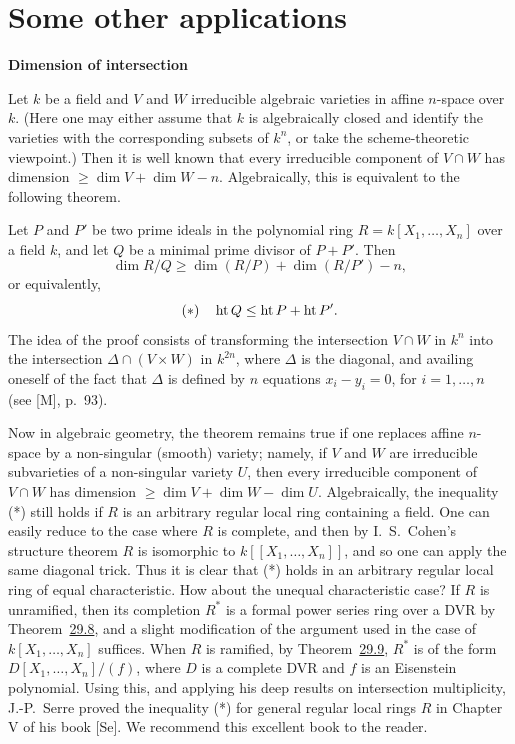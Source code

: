 \section{Some other applications}\label{sec:33}

\medskip
\noindent\textbf{Dimension of intersection}

Let $k$ be a field and $V$ and $W$ irreducible algebraic varieties in affine
$n$-space over $k$. (Here one may either assume that $k$ is algebraically closed
and identify the varieties with the corresponding subsets of $k^n$, or take the
scheme-theoretic viewpoint.) Then it is well known that every irreducible
component of $V \cap W$ has dimension $\ge \dim V + \dim W - n$. Algebraically, this
is equivalent to the following theorem.

Let $P$ and $P'$ be two prime ideals in the polynomial ring $R = k[X_1, \ldots, X_n]$
over a field $k$, and let $Q$ be a minimal prime divisor of $P + P'$. Then
\[
  \dim R/Q \ge \dim(R/P) + \dim(R/P') - n,
\]
or equivalently,
\[
  (*) \quad \operatorname{ht} Q \le \operatorname{ht} P + \operatorname{ht} P'.
\]
The idea of the proof consists of transforming the intersection $V \cap W$ in $k^n$
into the intersection $\Delta \cap (V \times W)$ in $k^{2n}$, where $\Delta$ is the diagonal, and
availing oneself of the fact that $\Delta$ is defined by $n$ equations
$x_i - y_i = 0$, for $i = 1, \ldots, n$ (see [M], p.~93).

Now in algebraic geometry, the theorem remains true if one replaces affine
$n$-space by a non-singular (smooth) variety; namely, if $V$ and $W$ are
irreducible subvarieties of a non-singular variety $U$, then every irreducible
component of $V \cap W$ has dimension $\ge \dim V + \dim W - \dim U$. Algebraically,
the inequality (*) still holds if $R$ is an arbitrary regular local ring containing
a field. One can easily reduce to the case where $R$ is complete, and then by
I.~S.~Cohen's structure theorem $R$ is isomorphic to $k[[X_1, \ldots, X_n]]$, and so one
can apply the same diagonal trick. Thus it is clear that (*) holds in an
arbitrary regular local ring of equal characteristic. How about the unequal
characteristic case? If $R$ is unramified, then its completion $R^*$ is a formal
power series ring over a DVR by Theorem~\hyperref[thm:29.8]{29.8}, and a slight modification of the
argument used in the case of $k[X_1, \ldots, X_n]$ suffices. When $R$ is ramified, by
Theorem~\hyperref[thm:29.9]{29.9}, $R^*$ is of the form $D[X_1, \ldots, X_n]/(f)$, where $D$ is a complete
DVR and $f$ is an Eisenstein polynomial. Using this, and applying his deep
results on intersection multiplicity, J.-P.~Serre proved the inequality (*) for
general regular local rings $R$ in Chapter V of his book [Se]. We recommend this
excellent book to the reader.

